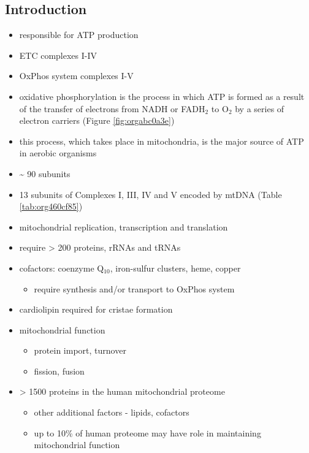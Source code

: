 \documentclass{scrartcl}
\begin{document}
\subsection{Introduction}
\label{sec:orgd9e6aaf}
\begin{itemize}
\item responsible for ATP production
\item ETC complexes I-IV
\item OxPhos system complexes I-V
\item oxidative phosphorylation is the process in which ATP is formed as a
result of the transfer of electrons from NADH or FADH\(_{\text{2}}\) to O\(_{\text{2}}\) by a
series of electron carriers (Figure \ref{fig:orgabc0a3e})
\item this process, which takes place in mitochondria, is the major source
of ATP in aerobic organisms

\item \textasciitilde{} 90 subunits
\item 13 subunits of Complexes I, III, IV and V encoded by mtDNA (Table \ref{tab:org460cf85})
\item mitochondrial replication, transcription and translation
\item require \textgreater{} 200 proteins, rRNAs and tRNAs
\item cofactors: coenzyme Q\(_{\text{10}}\), iron-sulfur clusters, heme, copper
\begin{itemize}
\item require synthesis and/or transport to OxPhos system
\end{itemize}
\item cardiolipin required for cristae formation
\item mitochondrial function
\begin{itemize}
\item protein import, turnover
\item fission, fusion
\end{itemize}
\item \textgreater{} 1500 proteins in the human mitochondrial proteome
\begin{itemize}
\item other additional factors - lipids, cofactors
\item up to 10\% of human proteome may have role in maintaining mitochondrial function
\end{itemize}
\end{itemize}
\end{document}
